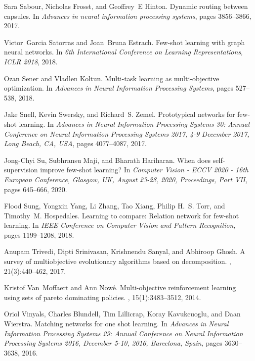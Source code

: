 \documentclass[final]{cvpr}
\begin{document}
\begin{thebibliography}{10}
	Sara Sabour, Nicholas Frosst, and Geoffrey~E Hinton.
	\newblock Dynamic routing between capsules.
	\newblock In {\em Advances in neural information processing systems}, pages
	3856--3866, 2017.
	
	Victor~Garcia Satorras and Joan~Bruna Estrach.
	\newblock Few-shot learning with graph neural networks.
	\newblock In {\em 6th International Conference on Learning Representations,
		{ICLR} 2018}, 2018.
	
	Ozan Sener and Vladlen Koltun.
	\newblock Multi-task learning as multi-objective optimization.
	\newblock In {\em Advances in Neural Information Processing Systems}, pages
	527--538, 2018.
	
	Jake Snell, Kevin Swersky, and Richard~S. Zemel.
	\newblock Prototypical networks for few-shot learning.
	\newblock In {\em Advances in Neural Information Processing Systems 30: Annual
		Conference on Neural Information Processing Systems 2017, 4-9 December 2017,
		Long Beach, CA, {USA}}, pages 4077--4087, 2017.
	
	Jong{-}Chyi Su, Subhransu Maji, and Bharath Hariharan.
	\newblock When does self-supervision improve few-shot learning?
	\newblock In {\em Computer Vision - {ECCV} 2020 - 16th European Conference,
		Glasgow, UK, August 23-28, 2020, Proceedings, Part {VII}}, pages 645--666,
	2020.
	
	Flood Sung, Yongxin Yang, Li Zhang, Tao Xiang, Philip H.~S. Torr, and
	Timothy~M. Hospedales.
	\newblock Learning to compare: Relation network for few-shot learning.
	\newblock In {\em {IEEE} Conference on Computer Vision and Pattern
		Recognition}, pages 1199--1208, 2018.
	
	Anupam Trivedi, Dipti Srinivasan, Krishnendu Sanyal, and Abhiroop Ghosh.
	\newblock A survey of multiobjective evolutionary algorithms based on
	decomposition.
	, 21(3):440--462, 2017.
	
	Kristof Van~Moffaert and Ann Now{\'e}.
	\newblock Multi-objective reinforcement learning using sets of pareto
	dominating policies.
	, 15(1):3483--3512,
	2014.
	
	Oriol Vinyals, Charles Blundell, Tim Lillicrap, Koray Kavukcuoglu, and Daan
	Wierstra.
	\newblock Matching networks for one shot learning.
	\newblock In {\em Advances in Neural Information Processing Systems 29: Annual
		Conference on Neural Information Processing Systems 2016, December 5-10,
		2016, Barcelona, Spain}, pages 3630--3638, 2016.
	

\end{thebibliography}
\end{document}
